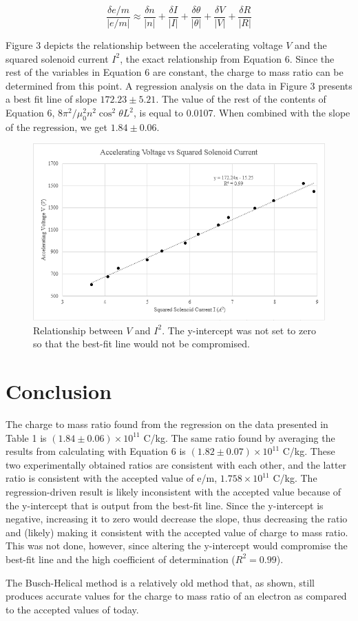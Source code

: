 \documentclass[%
 aip,
 amsmath,amssymb,
 reprint,%
floatfix,
]{revtex4-1}
\begin{document}
\begin{equation}
	\frac{\delta e/m}{\lvert e/m \rvert} \approx \frac{\delta n}{\lvert n \rvert} + \frac{\delta I}{\lvert I \rvert} + \frac{\delta \theta}{\lvert \theta \rvert} + \frac{\delta V}{\lvert V \rvert} + \frac{\delta R}{\lvert R \rvert}
\end{equation}


Figure 3 depicts the relationship between the accelerating voltage $V$ and the squared solenoid current $I^2$, the exact relationship from Equation 6. Since the rest of the variables in Equation 6 are constant, the charge to mass ratio can be determined from this point. A regression analysis on the data in Figure 3 presents a best fit line of slope $172.23 \pm 5.21$. The value of the rest of the contents of Equation 6, $8\pi^2/\mu_0^2n^2\cos^2{\theta}L^2$, is equal to 0.0107. When combined with the slope of the regression, we get $1.84 \pm 0.06$.

\begin{figure}[H]
	\centering
	\includegraphics[scale=0.9]{graph.png}
	\caption{Relationship between $V$ and $I^2$. The y-intercept was not set to zero so that the best-fit line would not be compromised.}
\end{figure}

\section{\label{sec:level5}Conclusion}

The charge to mass ratio found from the regression on the data presented in Table 1 is $(1.84 \pm 0.06) \times 10^{11}$ C/kg. The same ratio found by averaging the results from calculating with Equation 6 is $(1.82 \pm 0.07) \times 10^{11}$ C/kg. These two experimentally obtained ratios are consistent with each other, and the latter ratio is consistent with the accepted value of e/m, $1.758 \times 10^{11}$ C/kg. The regression-driven result is likely inconsistent with the accepted value because of the y-intercept that is output from the best-fit line. Since the y-intercept is negative, increasing it to zero would decrease the slope, thus decreasing the ratio and (likely) making it consistent with the accepted value of charge to mass ratio. This was not done, however, since altering the y-intercept would compromise the best-fit line and the high coefficient of determination ($R^2=0.99$). 

The Busch-Helical method is a relatively old method that, as shown, still produces accurate values for the charge to mass ratio of an electron as compared to the accepted values of today.

\nocite{*}
\end{document}
